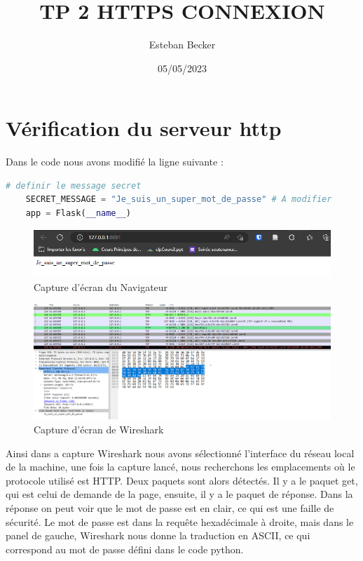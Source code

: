 \documentclass[11pt]{article}
\author{Esteban Becker}
\date{05/05/2023}
\title{TP 2 HTTPS CONNEXION}
\begin{document}
\maketitle

\section{Vérification du serveur http}

Dans le code nous avons modifié la ligne suivante :

\begin{lstlisting}[language=Python]
    # definir le message secret
    SECRET_MESSAGE = "Je_suis_un_super_mot_de_passe" # A modifier
    app = Flask(__name__)
\end{lstlisting}

\begin{figure}[!htb]
    \centering
    \includegraphics[width=\textwidth]{images/Navigateur_premier_mdp.png}
    \caption{Capture d'écran du Navigateur}
    \label{fig:1navigateur}
\end{figure}

\begin{figure}[!htb]
    \centering
    \includegraphics[width=\textwidth]{images/Wireshark_premier_mdp.png}
    \caption{Capture d'écran de Wireshark}
    \label{fig:1Wireshark}
\end{figure}


Ainsi dans a capture Wireshark nous avons sélectionné l'interface du réseau local de la machine, une fois la capture lancé, nous recherchons les emplacements où le protocole utilisé est HTTP.
Deux paquets sont alors détectés. Il y a le paquet get, qui est celui de demande de la page, ensuite, il y a le paquet de réponse.
Dans la réponse on peut voir que le mot de passe est en clair, ce qui est une faille de sécurité.
Le mot de passe est dans la requête hexadécimale à droite, mais dans le panel de gauche, Wireshark nous donne la traduction en ASCII, ce qui correspond au mot de passe défini dans le code python.
\end{document}
